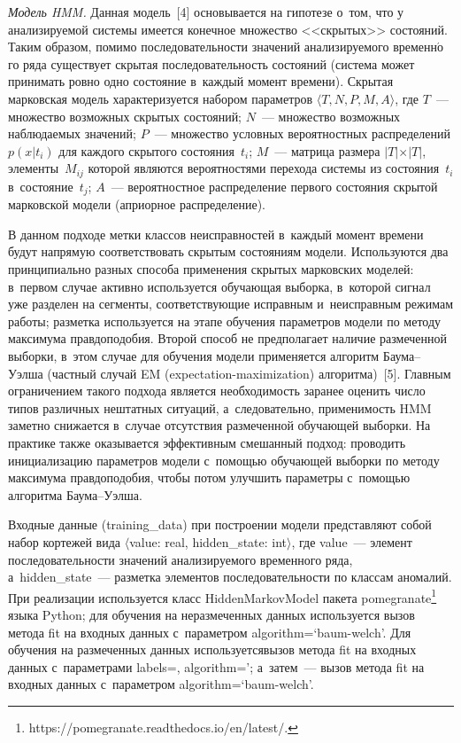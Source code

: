 \begin{multicols}{2}
      \textit{Модель HMM.} Данная модель~[4] основывается на гипотезе 
о~том, что у анализируемой сис\-те\-мы имеется конечное множество 
<<скрытых>> состо\-яний. Таким образом, помимо последовательности\linebreak 
значений анализируемого временн$\acute{\mbox{о}}$го ряда существует скрытая 
последовательность состояний (сис\-те\-ма может принимать ровно одно 
со\-сто\-яние в~каждый момент времени). Скрытая марковская модель 
характеризуется набором па\-ра\-мет\-ров $\langle T, N, P, M, A\rangle$, где $T$~--- 
множество возможных скрытых со\-сто\-яний; $N$~--- множество возможных 
наблюдаемых значений; $P$~--- множество условных вероятностных 
распределений $p(x\vert t_i)$ для каждого скрытого состояния~$t_i$; $M$~---  
мат\-ри\-ца размера $\vert T\vert \times \vert T\vert$, элементы~$M_{ij}$ которой 
являются вероятностями перехода системы из состояния~$t_i$ 
в~состояние~$t_j$; $A$~--- вероятностное распределение первого состояния 
скрытой марковской модели (априорное распределение).
      
      В данном подходе метки классов неисправностей в~каждый момент 
времени будут напрямую соответствовать скрытым состояниям модели. 
Используются два принципиально разных способа применения скрытых 
марковских моделей: в~первом случае активно используется обучающая 
выборка, в~которой сигнал уже разделен на сегменты, соответствующие 
исправным и~неисправным режимам работы; разметка используется на этапе 
обучения параметров модели по методу максимума правдоподобия. Второй 
способ не предполагает наличие размеченной выборки, в~этом случае для 
обуче\-ния модели применяется алгоритм Бау\-ма--Уэл\-ша (частный случай  
EM (expectation-maximization) ал\-го\-рит\-ма)~[5]. Главным ограничением такого подхода является 
необходимость заранее оценить число типов различных нештатных ситуаций, 
а~следовательно, применимость HMM заметно 
снижается в~случае отсутствия размеченной обучающей выборки. На практике 
также оказывается эффективным смешанный подход: проводить 
инициализацию параметров модели с~помощью обучающей выборки по методу 
максимума правдоподобия, чтобы потом улучшить параметры с~помощью 
алгоритма Бау\-ма--Уэлша.
      
      Входные данные ({training\_data}) при по\-стро\-ении модели 
представляют собой набор кортежей\linebreak
 вида $\langle${value}: {real}, 
{hidden\_state}: {int}$\rangle$, где {value}~--- элемент 
последовательности значений анализируемого временного ряда, 
а~{hidden\_state}~--- разметка элементов последовательности по классам\linebreak 
аномалий. При реализации используется класс {HiddenMarkovModel} 
пакета {pomegranate}\footnote[2]{{\sf  
https://pomegranate.readthedocs.io/en/latest/}.} языка Python; для обучения на 
неразмеченных данных используется вызов метода {fit} на входных 
данных с~параметром {algorithm}\;=\;`{baum-welch}'. Для обучения 
на размеченных данных используется\linebreak вызов метода {fit} на входных 
данных с~параметрами {labels}\;=, 
{algorithm}\;='; а~затем~--- вызов метода {fit} на 
входных данных с~параметром {algorithm}\;=`{baum-welch}'.
      

\end{multicols}
